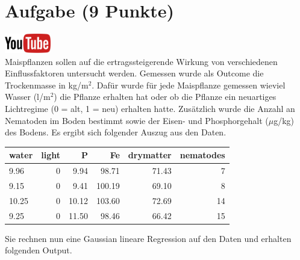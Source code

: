 \documentclass[a4paper, 10pt]{scrartcl}\usepackage[]{graphicx}\usepackage[]{xcolor}
\newenvironment{knitrout}{}{} %
\begin{document}
\section{Aufgabe \hfill (9 Punkte)}

\hfill\href{https://youtu.be/NSMrpAYzOcs}{\includegraphics[width =
  2cm]{img/youtube}}\\[1Ex]



Maispflanzen sollen auf die ertragssteigerende Wirkung von verschiedenen
Einflussfaktoren untersucht werden. Gemessen wurde als Outcome die
Trockenmasse in kg/m$^2$. Daf{\"u}r wurde f{\"u}r jede Maispflanze gemessen wieviel
Wasser (l/m$^2$) die Pflanze erhalten hat oder ob die Pflanze ein
neuartiges Lichtregime (0 = alt, 1 = neu) erhalten hatte. Zus{\"a}tzlich wurde
die Anzahl an Nematoden im Boden bestimmt sowie der Eisen- und
Phosphorgehalt ($\mu$g/kg) des Bodens. Es ergibt sich folgender Auszug aus
den Daten.

\begin{knitrout}
\color{fgcolor}\begin{table}[!h]
\centering
\begin{tabular}{lrrrrr}
\toprule
water & light & P & Fe & drymatter & nematodes\\
\midrule
9.96 & 0 & 9.94 & 98.71 & 71.43 & 7\\
9.15 & 0 & 9.41 & 100.19 & 69.10 & 8\\
10.25 & 0 & 10.12 & 103.60 & 72.69 & 14\\
9.25 & 0 & 11.50 & 98.46 & 66.42 & 15\\
\bottomrule
\end{tabular}
\end{table}

\end{knitrout}

Sie rechnen nun eine Gaussian lineare Regression auf den Daten und erhalten
folgenden \Rlogo Output.
\end{document}
